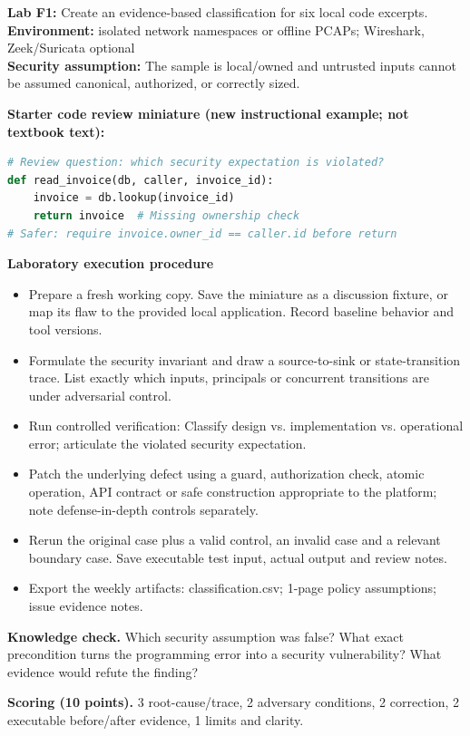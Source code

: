 \documentclass[10pt,letterpaper]{article}
\begin{document}
\begin{insight}\textbf{Lab F1:} Create an evidence-based classification for six local code excerpts.\\\textbf{Environment:} isolated network namespaces or offline PCAPs; Wireshark, Zeek/Suricata optional\\\textbf{Security assumption:} The sample is local/owned and untrusted inputs cannot be assumed canonical, authorized, or correctly sized.\end{insight}
\textbf{Starter code review miniature (new instructional example; not textbook text):}
\begin{lstlisting}[language=Python]
# Review question: which security expectation is violated?
def read_invoice(db, caller, invoice_id):
    invoice = db.lookup(invoice_id)
    return invoice  # Missing ownership check
# Safer: require invoice.owner_id == caller.id before return
\end{lstlisting}
\textbf{Laboratory execution procedure}
\begin{itemize}[leftmargin=*,itemsep=2pt]
\item Prepare a fresh working copy. Save the miniature as a discussion fixture, or map its flaw to the provided local application. Record baseline behavior and tool versions.
\item Formulate the security invariant and draw a source-to-sink or state-transition trace. List exactly which inputs, principals or concurrent transitions are under adversarial control.
\item Run controlled verification: Classify design vs. implementation vs. operational error; articulate the violated security expectation.
\item Patch the underlying defect using a guard, authorization check, atomic operation, API contract or safe construction appropriate to the platform; note defense-in-depth controls separately.
\item Rerun the original case plus a valid control, an invalid case and a relevant boundary case. Save executable test input, actual output and review notes.
\item Export the weekly artifacts: classification.csv; 1-page policy assumptions; issue evidence notes.
\end{itemize}
\textbf{Knowledge check.} Which security assumption was false? What exact precondition turns the programming error into a security vulnerability? What evidence would refute the finding?

\textbf{Scoring (10 points).} 3 root-cause/trace, 2 adversary conditions, 2 correction, 2 executable before/after evidence, 1 limits and clarity.
\end{document}
